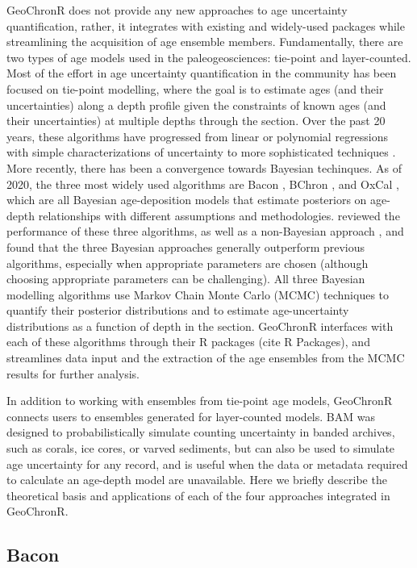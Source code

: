 \documentclass[gc, manuscript]{copernicus}
\begin{document}
GeoChronR does not provide any new approaches to age uncertainty quantification, rather, it integrates with existing and widely-used packages while streamlining the acquisition of age ensemble members.
Fundamentally, there are two types of age models used in the paleogeosciences: tie-point and layer-counted.
Most of the effort in age uncertainty quantification in the community has been focused on tie-point modelling, where the goal is to estimate ages (and their uncertainties) along a depth profile given the constraints of known ages (and their uncertainties) at multiple depths through the section.
Over the past 20 years, these algorithms have progressed from linear or polynomial regressions with simple characterizations of uncertainty to more sophisticated techniques \citep[\citet{heegaard05}]{clam}.
More recently, there has been a convergence towards Bayesian techinques.
As of 2020, the three most widely used algorithms are Bacon \citep{bacon}, BChron \citep{parnell2008flexible}, and OxCal \citep{ramsey2008deposition}, which are all Bayesian age-deposition models that estimate posteriors on age-depth relationships with different assumptions and methodologies.
\citet{trachsel2017} reviewed the performance of these three algorithms, as well as a non-Bayesian approach \citep{clam}, and found that the three Bayesian approaches generally outperform previous algorithms, especially when appropriate parameters are chosen (although choosing appropriate parameters can be challenging).
All three Bayesian modelling algorithms use Markov Chain Monte Carlo (MCMC) techniques to quantify their posterior distributions and to estimate age-uncertainty distributions as a function of depth in the section.
GeoChronR interfaces with each of these algorithms through their R packages (cite R Packages), and streamlines data input and the extraction of the age ensembles from the MCMC results for further analysis.

In addition to working with ensembles from tie-point age models, GeoChronR connects users to ensembles generated for layer-counted models.
BAM \citep{BAM} was designed to probabilistically simulate counting uncertainty in banded archives, such as corals, ice cores, or varved sediments, but can also be used to simulate age uncertainty for any record, and is useful when the data or metadata required to calculate an age-depth model are unavailable.
Here we briefly describe the theoretical basis and applications of each of the four approaches integrated in GeoChronR.

\subsection{Bacon}
\end{document}
